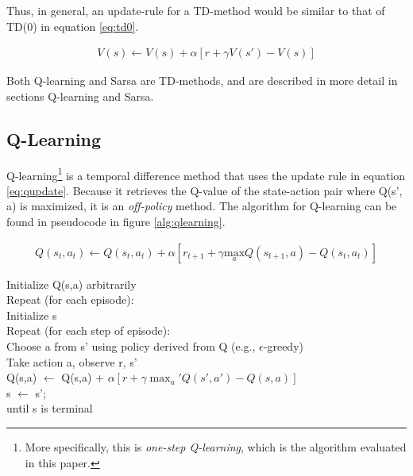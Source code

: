\documentclass{article}
\newcommand{\tab}{\hspace{10mm}}
\newcommand{\dtab}{\hspace{20mm}}
\begin{document}
Thus, in general, an update-rule for a TD-method would be similar to that of TD(0) in equation \ref{eq:td0}.
\begin{mdframed}
\begin{align}
V(s) \leftarrow V(s) + \alpha [r+\gamma V(s') - V(s)]\label{eq:td0}
\end{align}
\end{mdframed}
Both Q-learning and Sarsa are TD-methods, and are described in more detail in sections Q-learning and Sarsa.

\subsection{Q-Learning} 
Q-learning\footnote{More specifically, this is \textit{one-step Q-learning}, which is the algorithm evaluated in this paper.} is a temporal difference method that uses the update rule in equation \ref{eq:qupdate}. Because it retrieves the Q-value of the state-action pair where Q(s', a) is maximized, it is an \textit{off-policy} method. The algorithm for Q-learning can be found in pseudocode in figure \ref{alg:qlearning}.

\begin{mdframed}
\begin{align}
Q(s_t, a_t) \leftarrow Q(s_t,a_t) + \alpha \left[ r_{t+1} + \gamma \underset{a}{\text{max}} Q(s_{t+1},a) - Q(s_t,a_t)\right]\label{eq:qupdate}
\end{align}
\end{mdframed}


\begin{center} 
\begin{mdframed}
\begin{algorithm}[H]
Initialize Q(s,a) arbitrarily \\
Repeat (for each episode):\\
\tab Initialize s \\
\tab Repeat (for each step of episode):\\
\dtab Choose a from s' using policy derived from Q (e.g., $\epsilon$-greedy)\\
\dtab Take action a, observe r, s'\\
\dtab Q(s,a) $\leftarrow$ Q(s,a) + $\alpha [ r + \gamma \max_a' Q(s', a') - Q(s, a) ]$  \\
\dtab s $\leftarrow$ s'; \\
\tab until s is terminal\\
\end{algorithm}
\end{mdframed}
\label{alg:qlearning}
\end{center}
\end{document}
